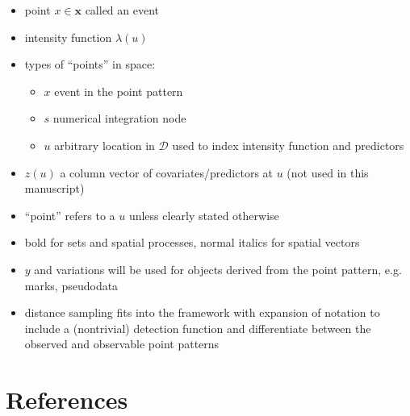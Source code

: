 \documentclass[review]{elsarticle}
\begin{document}
\begin{itemize}
\item point \(x \in \mathbf{x}\) called an event

\item intensity function \(\lambda(u)\)

\item types of ``points'' in space:
\begin{itemize}
\item \(x\) event in the point pattern
\item \(s\) numerical integration node
\item \(u\) arbitrary location in \(\mathcal{D}\) used to index intensity
function and predictors
\end{itemize}

\item \(z(u)\) a column vector of covariates/predictors at \(u\) (not used in
this manuscript)

\item ``point'' refers to a \(u\) unless clearly stated otherwise

\item bold for sets and spatial processes, normal italics for spatial vectors

\item \(y\) and variations will be used for objects derived from the point
pattern, e.g. marks, pseudodata

\item distance sampling fits into the framework with expansion of notation
to include a (nontrivial) detection function and differentiate between the
observed and observable point patterns

\end{itemize}


\section*{References}


\end{document}
